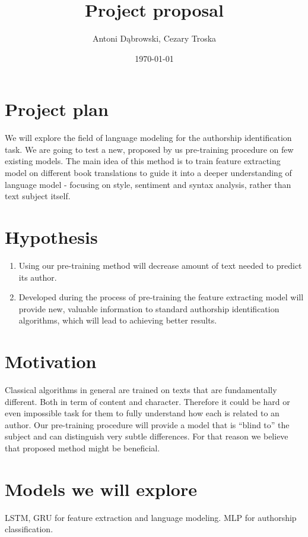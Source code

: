 \documentclass{article}
\title{Project proposal}
\author{Antoni Dąbrowski, Cezary Troska}
\date{\today}
\begin{document}
\maketitle
\section{Project plan}
We will explore the field of language modeling for the authorship identification task. We are going to test a new, proposed by us pre-training procedure on few existing models. The main idea of this method is to train feature extracting model on different book translations to guide it into a deeper understanding of language model - focusing on style, sentiment and syntax analysis, rather than text subject itself.

\section{Hypothesis}
\begin{enumerate}
    \item Using our pre-training method will decrease amount of text needed to predict its author.
    \item Developed during the process of pre-training the feature extracting model will provide new, valuable information to standard authorship identification algorithms, which will lead to achieving better results.
\end{enumerate}

\section{Motivation}
Classical algorithms in general are trained on texts that are fundamentally different. Both in term of content and character. Therefore it could be hard or even impossible task for them to fully understand how each is related to an author. Our pre-training procedure will provide a model that is ``blind to'' the subject and can distinguish very subtle differences. For that reason we believe that proposed method might be beneficial.


\section{Models we will explore}
LSTM, GRU for feature extraction and language modeling. MLP for authorship classification.
\end{document}
